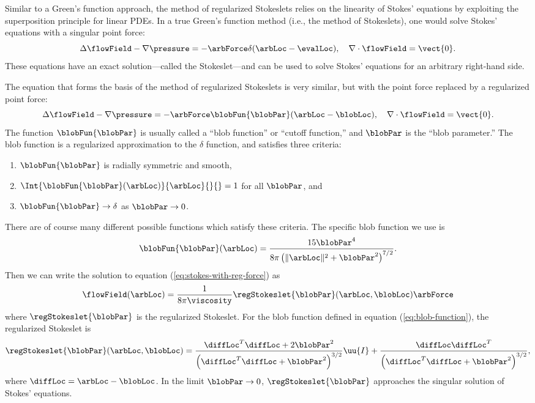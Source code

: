 Similar to a Green's function approach, the method of regularized
Stokeslets relies on the linearity of Stokes' equations by exploiting
the superposition principle for linear PDEs. In a true Green's
function method (i.e., the method of Stokeslets), one would solve
Stokes' equations with a singular point force:
\begin{equation}
  \label{eq:stokes-with-pt-force}
  \Delta \flowField - \nabla \pressure = -\arbForce \delta(\arbLoc
  - \evalLoc), \quad \nabla \cdot \flowField = \vect{0}.
\end{equation}
These equations have an exact solution---called the Stokeslet---and
can be used to solve Stokes' equations for an arbitrary right-hand
side.

The equation that forms the basis of the method of regularized
Stokeslets is very similar, but with the point force replaced by a
regularized point force:
\begin{equation}
  \label{eq:stokes-with-reg-force}
  \Delta \flowField - \nabla \pressure = -\arbForce
  \blobFun{\blobPar}(\arbLoc - \blobLoc), \quad \nabla \cdot
  \flowField = \vect{0}.
\end{equation}
The function $\blobFun{\blobPar}$ is usually called a ``blob
function'' or ``cutoff function,'' and $\blobPar$ is the ``blob
parameter.'' The blob function is a regularized approximation to the
$\delta$ function, and satisfies three criteria:
\begin{enumerate}
\item $\blobFun{\blobPar}$ is radially symmetric and smooth, 
\item $\Int{\blobFun{\blobPar}(\arbLoc)}{\arbLoc}{}{} = 1$ for all
  $\blobPar$, and
\item $\blobFun{\blobPar} \rightarrow \delta$ as $\blobPar \rightarrow
  0$.
\end{enumerate}
There are of course many different possible functions which satisfy
these criteria. The specific blob function we use is
\begin{equation}
  \label{eq:blob-function}
  \blobFun{\blobPar}(\arbLoc) = \frac{15 \blobPar^4}{8 \pi
    \left(\|\arbLoc\|^2 + \blobPar^2 \right)^{7/2}}.
\end{equation}
Then we can write the solution to equation
(\ref{eq:stokes-with-reg-force}) as
\begin{equation}
  \label{eq:solution-to-reg-force}
  \flowField(\arbLoc) = \frac{1}{8\pi \viscosity}
  \regStokeslet{\blobPar} (\arbLoc, \blobLoc) \arbForce
\end{equation}
where $\regStokeslet{\blobPar}$ is the regularized Stokeslet. For the
blob function defined in equation (\ref{eq:blob-function}), the
regularized Stokeslet is
\begin{equation}
  \label{eq:reg-stokeslet}
  \regStokeslet{\blobPar}(\arbLoc, \blobLoc) = \frac{\diffLoc^T \diffLoc +
    2\blobPar^2}{\left(\diffLoc^T \diffLoc + \blobPar^2 \right)^{3/2}}
  \uu{I} + \frac{\diffLoc \diffLoc^T}{\left(\diffLoc^T \diffLoc +
      \blobPar^2 \right)^{3/2}},
\end{equation}
where $\diffLoc = \arbLoc - \blobLoc$. In the limit $\blobPar
\rightarrow 0$, $\regStokeslet{\blobPar}$ approaches the singular
solution of Stokes' equations.

